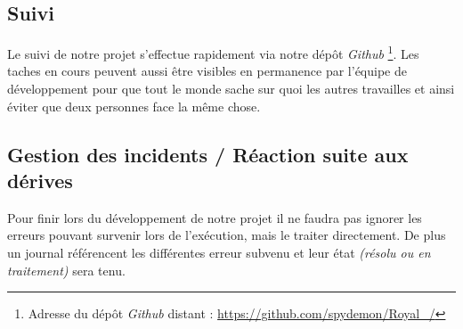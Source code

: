 \documentclass[etudiants]{support-iutrs}
\begin{document}
\subsection{Suivi}

Le suivi de notre projet s'effectue rapidement via notre dépôt \emph{Github} 
\footnote{Adresse du dépôt \emph{Github} distant : \url{https://github.com/spydemon/Royal_/}}.
Les taches en cours peuvent aussi être visibles en permanence par l’équipe de développement pour que tout le monde sache sur quoi les autres travailles et ainsi éviter que deux personnes face la même chose. 

\subsection{Gestion des incidents / Réaction suite aux dérives}
Pour finir lors du développement de notre projet il ne faudra pas ignorer les erreurs pouvant survenir lors de l'exécution, mais le traiter directement. 
De plus un journal référencent les différentes erreur subvenu et leur état \textit{(résolu ou en traitement)} sera tenu.   
\end{document}
